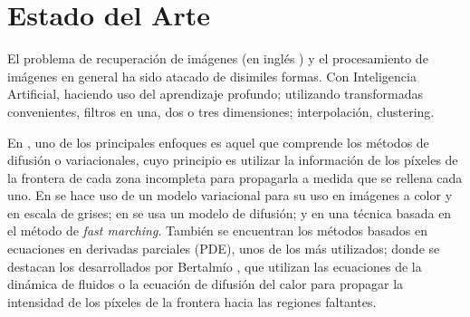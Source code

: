 \section*{Estado del Arte}

El problema de recuperaci\'on de im\'agenes (en ingl\'es \II) y el procesamiento de imágenes en general ha sido atacado de disimiles formas. Con Inteligencia Artificial, haciendo uso del aprendizaje profundo; utilizando transformadas convenientes, filtros en una, dos o tres dimensiones; interpolaci\'on, clustering.

En \II, uno de los principales enfoques es aquel que comprende los m\'etodos de difusión o variacionales, cuyo principio es utilizar la informaci\'on de los p\'ixeles de la frontera de cada zona incompleta para propagarla a medida que se rellena cada uno. En \cite{ballester2001variational} se hace uso de un modelo variacional para su uso en im\'agenes a color y en escala de grises; en \cite{chan2001nontexture} se usa un modelo de difusión; y en \cite{telea2004image} una t\'ecnica basada en el m\'etodo de \textit{fast marching}. También se encuentran los métodos basados en ecuaciones en derivadas parciales (PDE), unos de los m\'as utilizados; donde se destacan los desarrollados por Bertalmío \cite{bertalmio2001navier,bertalmio2000image}, que utilizan las ecuaciones de la dinámica de fluidos o la ecuación de difusión del calor para propagar la intensidad de los píxeles de la frontera hacia las regiones faltantes.
